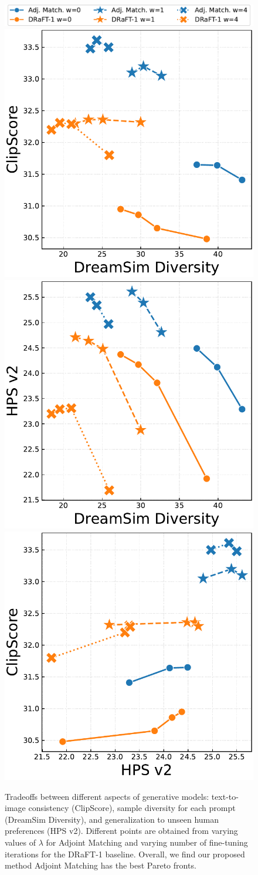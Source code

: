 \documentclass[]{fairmeta}
\begin{document}
\begin{figure}
    \centering
    \includegraphics[width=0.65\linewidth]{figs/metrics_relationship_plots/legend.pdf}\\
    \includegraphics[width=0.325\linewidth]{figs/metrics_relationship_plots/dreamsim_diversity_vs_clipscore.pdf}
    \includegraphics[width=0.325\linewidth]{figs/metrics_relationship_plots/dreamsim_diversity_vs_hps_v2.pdf}
    \includegraphics[width=0.325\linewidth]{figs/metrics_relationship_plots/hps_v2_vs_clipscore.pdf}
    \caption{Tradeoffs between different aspects of generative models: text-to-image consistency (ClipScore), sample diversity for each prompt (DreamSim Diversity), and generalization to unseen human preferences (HPS v2). Different points are obtained from varying values of $\lambda$ for Adjoint Matching and varying number of fine-tuning iterations for the DRaFT-1 baseline. Overall, we find our proposed method Adjoint Matching has the best Pareto fronts.}
    \label{fig:tradeoffs}
\end{figure}
\end{document}
